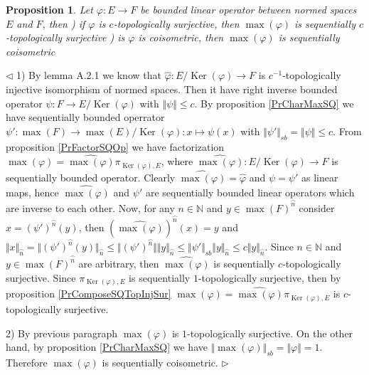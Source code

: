\documentclass[12pt]{article}
\newtheorem{proposition}[theorem]{Proposition}
\newenvironment{proof}{\par $\triangleleft$}{$\triangleright$}
\begin{document}
\begin{proposition}\label{PrMaxPreserveQuotients} Let $\varphi:E\to F$ be bounded linear operator between normed spaces $E$ and $F$, then
) if $\varphi$ is $c$-topologically surjective, then $\max(\varphi)$ is sequentially $c$-topologically surjective
) is $\varphi$ is coisometric, then $\max(\varphi)$ is sequentially coisometric
\end{proposition}
\begin{proof} 1) By lemma A.2.1 \cite{EROpSp} we know that $\widehat{\varphi}:E/\operatorname{Ker}(\varphi)\to F$ is $c^{-1}$-topologically injective isomorphism of normed spaces. Then it have right inverse bounded operator $\psi:F\to E/\operatorname{Ker}(\varphi)$ with $\Vert\psi\Vert\leq c$. By proposition \ref{PrCharMaxSQ} we have sequentially bounded operrator $\psi':\max(F)\to\max(E)/\operatorname{Ker}(\varphi):x\mapsto \psi(x)$ with $\Vert\psi'\Vert_{sb}=\Vert\psi\Vert\leq c$. From proposition \ref{PrFactorSQOp} we have factorization $\max(\varphi)=\widehat{\max(\varphi)}\pi_{\operatorname{Ker}(\varphi),E}$, where $\widehat{\max(\varphi)}:E/\operatorname{Ker}(\varphi)\to F$ is sequentially bounded operator. Clearly $\widehat{\max(\varphi)}=\widehat{\varphi}$ and $\psi=\psi'$ as linear maps, hence $\widehat{\max(\varphi)}$ and $\psi'$ are sequentially bounded linear operators which are inverse to each other. Now, for any $n\in\mathbb{N}$  and $y\in\max(F)^{\wideparen{n}}$ consider $x=(\psi')^{\wideparen{n}}(y)$, then $(\widehat{\max(\varphi)})^{\wideparen{n}}(x)=y$ and $\Vert x\Vert_{\wideparen{n}}=\Vert(\psi')^{\wideparen{n}}(y)\Vert_{\wideparen{n}}\leq\Vert(\psi')^{\wideparen{n}}\Vert\Vert y\Vert_{\wideparen{n}}\leq\Vert \psi'\Vert_{sb}\Vert y\Vert_{\wideparen{n}}\leq c\Vert y\Vert_{\wideparen{n}}$. Since $n\in\mathbb{N}$ and $y\in \max(F)^{\wideparen{n}}$ are arbitrary, then $\widehat{\max(\varphi)}$ is sequentially $c$-topologically surjective. Since $\pi_{\operatorname{Ker}(\varphi),E}$ is sequentially $1$-topologically surjective, then by proposition \ref{PrComposeSQTopInjSur} $\max(\varphi)=\widehat{\max(\varphi)}\pi_{\operatorname{Ker}(\varphi),E}$ is $c$-topologically surjective.

2) By previous paragraph $\max(\varphi)$ is $1$-topologically surjective. On the other hand, by proposition \ref{PrCharMaxSQ} we have $\Vert\max(\varphi)\Vert_{sb}=\Vert\varphi\Vert=1$. Therefore $\max(\varphi)$ is sequentially coisometric.
\end{proof}
\end{document}
